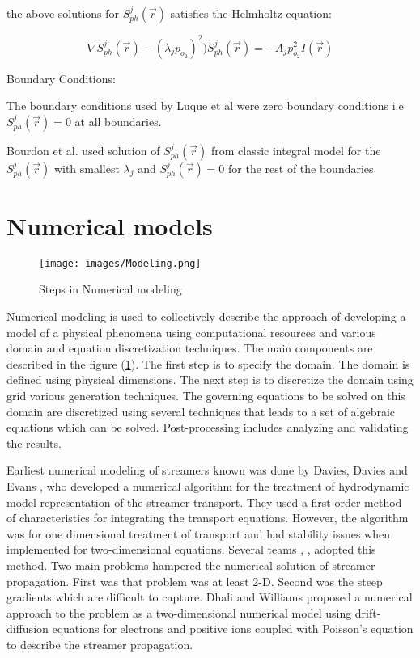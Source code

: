 \documentclass[paper=a4, fontsize=13pt]{scrartcl}
\begin{document}
the above solutions for $S_{ph}^j (\vec{r})$ satisfies the Helmholtz equation:

\begin{equation} 
\nabla S_{ph}^j (\vec{r}) - (\lambda_j p_{o_2})^2) S_{ph}^j (\vec{r}) = - A_j p_{o_2}^2 I(\vec{r})
\end{equation} 

Boundary Conditions:

The boundary conditions used by Luque et al \cite{Luque2007PhotoionizationModes} were zero boundary conditions i.e $S_{ph}^j (\vec{r}) = 0$ at all boundaries. 

Bourdon et al. \cite{Bourdon2007EfficientEquations} used solution of $S_{ph}^j (\vec{r})$ from classic integral model for the $S_{ph}^j (\vec{r})$ with smallest $\lambda_j$ and  $S_{ph}^j (\vec{r}) = 0$ for the rest of the boundaries. 


\section{Numerical models}


\begin{figure}[t!]
\centering
\texttt{[image: images/Modeling.png]}
 \caption{Steps in Numerical modeling  \cite{Moukalled2016TheDynamics} }
  \label{fig:Numerical Modeling}
\end{figure}

Numerical modeling is used to collectively describe the approach of developing a model of a physical phenomena using computational resources and various domain and equation discretization techniques. The main components are described in the figure (\ref{fig:Numerical Modeling}). The first step is to specify the domain. The domain is defined using physical dimensions. The next step is to discretize the domain using grid various generation techniques. The governing equations to be solved on this domain are discretized using several techniques that leads to a set of algebraic equations which can be solved. Post-processing includes analyzing and validating the results. 

Earliest numerical modeling of streamers known was done by Davies, Davies and Evans \cite{Davies1971ComputerDischarges}, who developed a numerical algorithm for the treatment of hydrodynamic model representation of the streamer transport. They used a first-order method of characteristics for integrating the transport equations. However, the algorithm was for one dimensional treatment of transport and had stability issues when implemented for two-dimensional equations. Several teams \cite{Kline1974CalculationsGaps}, \cite{Abbas1980ABreakdown}, \cite{Yoshida1976ComputerOvervoltages} adopted this method. Two main problems hampered the numerical solution of streamer propagation. First was that problem was at least 2-D. Second was the steep gradients which are difficult to capture. Dhali and Williams proposed a numerical approach to the problem as a two-dimensional numerical model using drift-diffusion equations for electrons and positive ions coupled with Poisson's equation to describe the streamer propagation.
\end{document}
